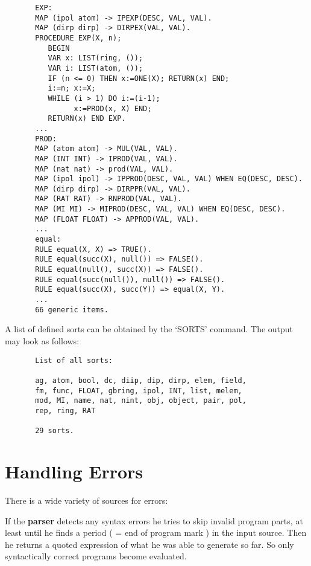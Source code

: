 \begin{verbatim}
       EXP:
       MAP (ipol atom) -> IPEXP(DESC, VAL, VAL). 
       MAP (dirp dirp) -> DIRPEX(VAL, VAL). 
       PROCEDURE EXP(X, n); 
          BEGIN 
          VAR x: LIST(ring, ()); 
          VAR i: LIST(atom, ()); 
          IF (n <= 0) THEN x:=ONE(X); RETURN(x) END; 
          i:=n; x:=X; 
          WHILE (i > 1) DO i:=(i-1); 
                x:=PROD(x, X) END; 
          RETURN(x) END EXP. 
       ...
       PROD:
       MAP (atom atom) -> MUL(VAL, VAL). 
       MAP (INT INT) -> IPROD(VAL, VAL). 
       MAP (nat nat) -> prod(VAL, VAL). 
       MAP (ipol ipol) -> IPPROD(DESC, VAL, VAL) WHEN EQ(DESC, DESC). 
       MAP (dirp dirp) -> DIRPPR(VAL, VAL). 
       MAP (RAT RAT) -> RNPROD(VAL, VAL). 
       MAP (MI MI) -> MIPROD(DESC, VAL, VAL) WHEN EQ(DESC, DESC). 
       MAP (FLOAT FLOAT) -> APPROD(VAL, VAL). 
       ...
       equal:
       RULE equal(X, X) => TRUE(). 
       RULE equal(succ(X), null()) => FALSE(). 
       RULE equal(null(), succ(X)) => FALSE(). 
       RULE equal(succ(null()), null()) => FALSE(). 
       RULE equal(succ(X), succ(Y)) => equal(X, Y). 
       ...
       66 generic items.
\end{verbatim}

A list of defined sorts can be obtained by the 
`SORTS' command. The output may look 
as follows: 

\begin{verbatim}
       List of all sorts: 
        
       ag, atom, bool, dc, diip, dip, dirp, elem, field, 
       fm, func, FLOAT, gbring, ipol, INT, list, melem, 
       mod, MI, name, nat, nint, obj, object, pair, pol, 
       rep, ring, RAT 
        
       29 sorts.
\end{verbatim}


\section{Handling Errors}

There is a wide variety of sources for errors:

If the {\bf parser} detects any syntax 
errors he tries to skip invalid 
program parts, at least until he finds a period ( = end of program mark )
in the input source.
Then he returns a quoted expression of what he was able to generate 
so far. So only syntactically correct programs become 
evaluated.

